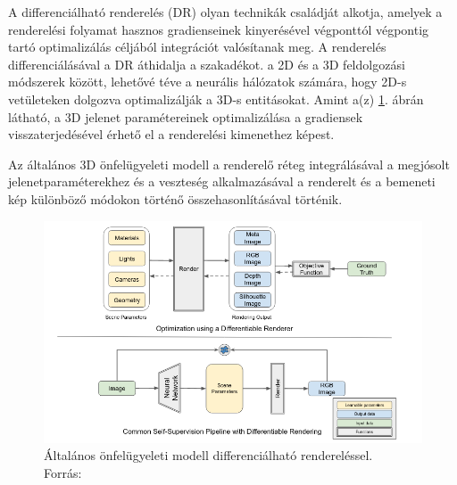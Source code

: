 \documentclass[12pt,a4]{article}
\begin{document}
A differenciálható renderelés (DR) olyan technikák családját alkotja, amelyek a renderelési folyamat hasznos gradienseinek kinyerésével végponttól végpontig tartó optimalizálás céljából integrációt valósítanak meg. A renderelés differenciálásával a DR áthidalja a szakadékot.
a 2D és a 3D feldolgozási módszerek között, lehetővé téve a neurális hálózatok számára, hogy 2D-s vetületeken dolgozva optimalizálják a 3D-s entitásokat. Amint a(z) \ref{fig:diffrenderer}. ábrán látható, a 3D jelenet paramétereinek optimalizálása a gradiensek visszaterjedésével érhető el a renderelési kimenethez képest. 

Az általános 3D önfelügyeleti modell a renderelő réteg integrálásával a megjósolt jelenetparaméterekhez és a veszteség alkalmazásával a renderelt és a bemeneti kép különböző módokon történő összehasonlításával történik.

    \begin{figure}[h]	
		\centering
		\includegraphics[width=1\linewidth]{diffrenderer}
		\caption{Általános önfelügyeleti modell differenciálható rendereléssel.\\
                Forrás: \cite{diffrenderer}}
        \label{fig:diffrenderer}
	\end{figure}
 \newpage
\end{document}
